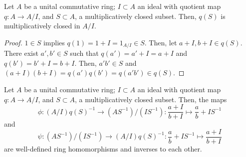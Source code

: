 \begin{lem}
Let $A$ be a unital commutative ring;
$I \subset A$ an ideal with quotient map $q : A \to A/I$,
and $S \subset A$, a multiplicatively closed subset.
Then, $q(S)$ is multiplicatively closed in $A/I$.
\end{lem}
\begin{proof}
$1 \in S$ implies $q(1) = 1 + I = 1_{A/I} \in S$.
Then, let $a + I, b + I \in q(S)$. There exist
$a', b' \in S$ such that $q(a') = a' + I = a + I$
and $q(b') = b' + I = b + I$. Then, $a'b' \in S$ and
$(a + I)(b + I) = q(a')q(b') = q(a'b') \in q(S)$.
\end{proof}

\begin{lem}\label{lem:local-quot}
Let $A$ be a unital commutative ring;
$I \subset A$ an ideal with quotient map $q : A \to A/I$,
and $S \subset A$, a multiplicatively closed subset.
Then, the maps
\[
\phi : (A/I)q(S)^{-1} \to (AS^{-1})/(IS^{-1})
     : \frac{a + I}{b + I} \mapsto \frac{a}{b} + IS^{-1}
\]
and
\[
\psi : (AS^{-1})/(IS^{-1}) \to (A/I)q(S)^{-1}
     : \frac{a}{b} + IS^{-1} \mapsto \frac{a + I}{b + I}
\]
are well-defined ring homomorphisms and inverses to each other.
\end{lem}
